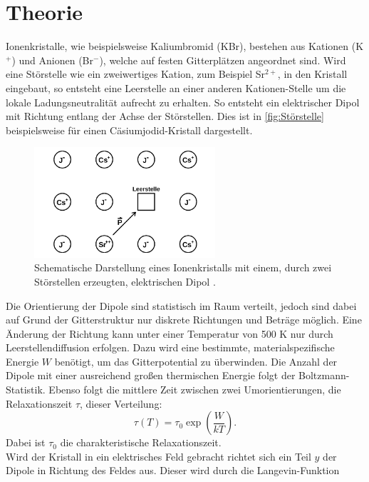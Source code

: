 \section{Theorie}
\label{sec:Theorie}
Ionenkristalle, wie beispielsweise Kaliumbromid (KBr), bestehen aus Kationen (K$^{+}$) und Anionen (Br$^{-}$), welche
auf festen Gitterplätzen angeordnet sind.
Wird eine Störstelle wie ein zweiwertiges Kation, zum Beispiel Sr$^{2+}$, in den Kristall eingebaut, so
entsteht eine Leerstelle an einer anderen Kationen-Stelle um die lokale Ladungsneutralität aufrecht zu erhalten.
So entsteht ein elektrischer Dipol mit Richtung entlang der Achse der Störstellen. Dies ist in \autoref{fig:Störstelle}
beispielsweise für einen Cäsiumjodid-Kristall dargestellt.
\begin{figure}[H]
  \centering
  \includegraphics[width=0.6\textwidth]{pics/Stoerstelle.png}
  \caption{Schematische Darstellung eines Ionenkristalls mit einem, durch
  zwei Störstellen erzeugten, elektrischen Dipol \cite{Anleitung}.}
  \label{fig:Störstelle}
\end{figure}
Die Orientierung der Dipole sind statistisch im Raum verteilt, jedoch sind dabei auf Grund der Gitterstruktur
nur diskrete Richtungen und Beträge möglich. Eine Änderung der Richtung
kann unter einer Temperatur von 500 K nur durch Leerstellendiffusion erfolgen.
Dazu wird eine bestimmte, materialspezifische Energie $W$ benötigt, um das Gitterpotential zu überwinden.
Die Anzahl der Dipole mit einer ausreichend großen thermischen Energie folgt der Boltzmann-Statistik.
Ebenso folgt die mittlere Zeit zwischen zwei Umorientierungen, die Relaxationszeit $\tau$, dieser Verteilung:
\begin{equation}
  \tau(T) = \tau_0 \exp{\left(\frac{W}{kT}\right)} .
  \label{eq:Relaxationszeit}
\end{equation}
Dabei ist $\tau_0$ die charakteristische Relaxationszeit.\\
Wird der Kristall in ein elektrisches Feld gebracht richtet sich ein Teil $y$ der Dipole in Richtung
des Feldes aus. Dieser wird durch die Langevin-Funktion
